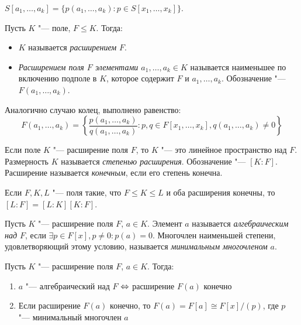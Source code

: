 \begin{note}
	$S[a_1, \dotsc, a_k] = \{p(a_1, \dotsc, a_k) : p \in S[x_1, \dotsc, x_k]\}$.
\end{note}

\begin{definition}
	Пусть $K$ "--- поле, $F \le K$. Тогда:
	\begin{itemize}
		\item $K$ называется \textit{расширением} $F$.
		\item \textit{Расширением поля $F$ элементами $a_1, \dotsc, a_k \in K$} называется наименьшее по включению подполе в $K$, которое содержит $F$ и $a_1, \dotsc, a_k$. Обозначение "--- $F(a_1, \dotsc, a_k)$.
	\end{itemize}
\end{definition}

\begin{note}
	Аналогично случаю колец, выполнено равенство:
	\[F(a_1, \dotsc, a_k) = \left\{\frac{p(a_1, \dotsc, a_k)}{q(a_1, \dotsc, a_k)} : p, q \in F[x_1, \dotsc, x_k], q(a_1, \dotsc, a_k) \ne 0\right\}\]
\end{note}

\begin{definition}
	Если поле $K$ "--- расширение поля $F$, то $K$ "--- это линейное пространство над $F$. Размерность $K$ называется \textit{степенью расширения}. Обозначение "--- $[K : F]$. Расширение называется \textit{конечным}, если его степень конечна.
\end{definition}

\begin{note}
	Если $F, K, L$ "--- поля такие, что $F \le K \le L$ и оба расширения конечны, то $[L : F] = [L : K][K : F]$.
\end{note}

\begin{definition}
	Пусть $K$ "--- расширение поля $F$, $a \in K$. Элемент $a$ называется \textit{алгебраическим над $F$}, если $\exists p \in F[x], p \ne 0: p(a) = 0$. Многочлен наименьшей степени, удовлетворяющий этому условию, называется \textit{минимальным многочленом} $a$.
\end{definition}

\begin{theorem}
	Пусть $K$ "--- расширение поля $F$, $a \in K$. Тогда:
	\begin{enumerate}
		\item $a$ "--- алгебраический над $F$ $\Leftrightarrow$ расширение $F(a)$ конечно
		\item Если расширение $F(a)$ конечно, то $F(a) = F[a] \cong F[x] / (p)$, где $p$ "--- минимальный многочлен $a$
	\end{enumerate}
\end{theorem}

